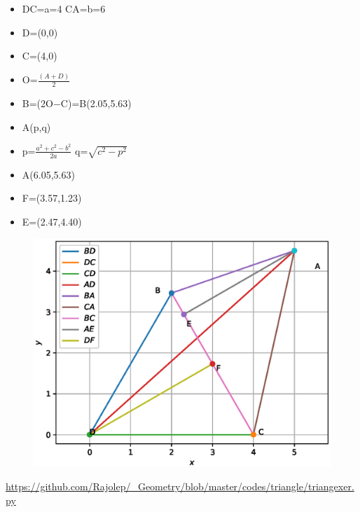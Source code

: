 \begin{frame}

\begin{itemize}
\item DC=a=4  CA=b=6
\item D=(0,0) \\
\item C=(4,0)\\
\item O=$\frac{(A+D)}{2}$ \\
\item B=(2O$-$C)=B(2.05,5.63)\\
\item A(p,q)\\
\item p=$\frac{a^2+c^2-b^2}{2a}$ q=$\sqrt{c^2-p^2}$\\
\item A(6.05,5.63)\\
\item F=(3.57,1.23)\\
\item E=(2.47,4.40)
\end{itemize}

\end{frame}
\begin{frame}
\begin{figure}
\includegraphics[scale=0.4]{./figs/triexe.eps}
\end{figure}
\url{https://github.com/Rajolep/_Geometry/blob/master/codes/triangle/triangexer.py}
\end{frame}
